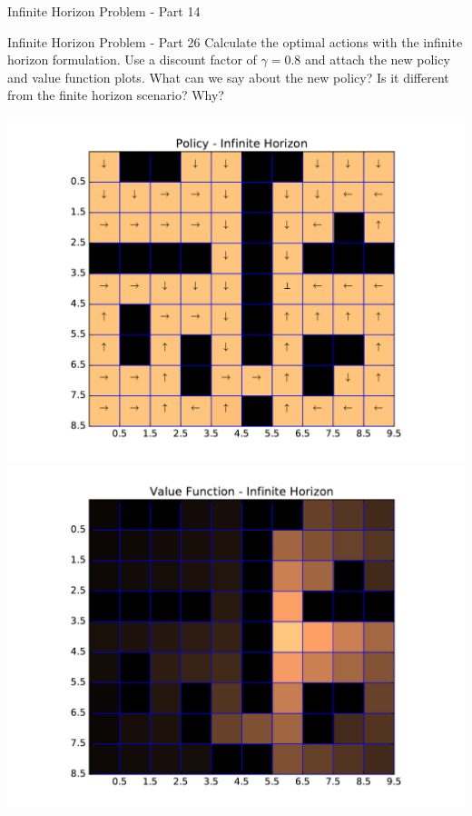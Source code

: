 \begin{questions}
\begin{question}{Infinite Horizon Problem - Part 1}{4}
\begin{answer}
\end{answer}

\end{question}



\begin{question}{Infinite Horizon Problem - Part 2}{6}
Calculate the optimal actions with the infinite horizon formulation. Use a discount factor of $\gamma=0.8$ and attach the new policy and value function plots.
What can we say about the new policy? Is it different from the finite horizon scenario? Why?

\begin{answer}
\includegraphics[scale=0.4]{Gridworld/policy_Inf_08.pdf}
\includegraphics[scale=0.4]{Gridworld/value_Inf_08.pdf}\\


\end{answer}
\end{question}
\end{questions}
